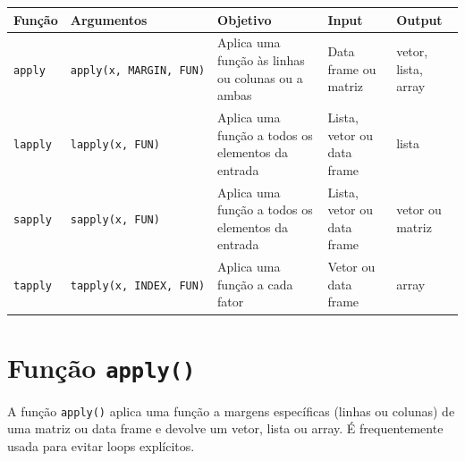 \documentclass[
]{book}
\begin{document}
\begin{longtable}[]{@{}
  >{\raggedright\arraybackslash}p{}
  >{\raggedright\arraybackslash}p{}
  >{\raggedright\arraybackslash}p{}
  >{\raggedright\arraybackslash}p{}
  >{\raggedright\arraybackslash}p{}@{}}
\toprule\noalign{}
\begin{minipage}[b]{\linewidth}\raggedright
\textbf{Função}
\end{minipage} & \begin{minipage}[b]{\linewidth}\raggedright
\textbf{Argumentos}
\end{minipage} & \begin{minipage}[b]{\linewidth}\raggedright
\textbf{Objetivo}
\end{minipage} & \begin{minipage}[b]{\linewidth}\raggedright
\textbf{Input}
\end{minipage} & \begin{minipage}[b]{\linewidth}\raggedright
\textbf{Output}
\end{minipage} \\
\midrule\noalign{}
\endhead
\bottomrule\noalign{}
\endlastfoot
\texttt{apply} & \texttt{apply(x,\ MARGIN,\ FUN)} & Aplica uma função às linhas ou colunas ou a ambas & Data frame ou matriz & vetor, lista, array \\
\texttt{lapply} & \texttt{lapply(x,\ FUN)} & Aplica uma função a todos os elementos da entrada & Lista, vetor ou data frame & lista \\
\texttt{sapply} & \texttt{sapply(x,\ FUN)} & Aplica uma função a todos os elementos da entrada & Lista, vetor ou data frame & vetor ou matriz \\
\texttt{tapply} & \texttt{tapply(x,\ INDEX,\ FUN)} & Aplica uma função a cada fator & Vetor ou data frame & array \\
\end{longtable}

\section{\texorpdfstring{Função \texttt{apply()}}{Função apply()}}\label{funuxe7uxe3o-apply}

A função \texttt{apply()} aplica uma função a margens específicas (linhas ou
colunas) de uma matriz ou data frame e devolve um vetor, lista ou array.
É frequentemente usada para evitar loops explícitos.
\end{document}
